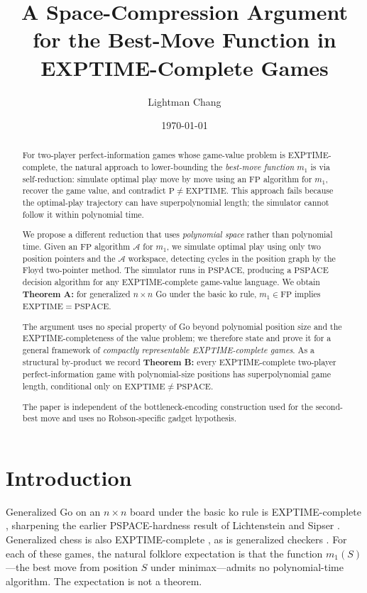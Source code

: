 \documentclass[11pt,a4paper]{amsart}
\title{A Space-Compression Argument for the Best-Move Function
  in EXPTIME-Complete Games}
\author{Lightman Chang}
\date{\today}
\theoremstyle{plain}
\theoremstyle{definition}
\theoremstyle{remark}
\newcommand{\FP}{\mathrm{FP}}
\newcommand{\PTIME}{\mathrm{P}}
\newcommand{\EXPTIME}{\mathrm{EXPTIME}}
\newcommand{\PSPACE}{\mathrm{PSPACE}}
\begin{document}
\maketitle

\begin{abstract}
For two-player perfect-information games whose game-value problem is
EXPTIME-complete, the natural approach to lower-bounding the
\emph{best-move function} $m_1$ is via self-reduction: simulate optimal
play move by move using an $\FP$ algorithm for $m_1$, recover the game
value, and contradict $\PTIME \neq \EXPTIME$. This approach fails
because the optimal-play trajectory can have superpolynomial length;
the simulator cannot follow it within polynomial time.

We propose a different reduction that uses \emph{polynomial space}
rather than polynomial time. Given an $\FP$ algorithm $\mathcal{A}$ for
$m_1$, we simulate optimal play using only two position pointers and
the $\mathcal{A}$ workspace, detecting cycles in the position graph by
the Floyd two-pointer method. The simulator runs in $\PSPACE$,
producing a $\PSPACE$ decision algorithm for any
EXPTIME-complete game-value language. We obtain
\textbf{Theorem A:} for generalized $n \times n$ Go under the basic ko
rule, $m_1 \in \FP$ implies $\EXPTIME = \PSPACE$.

The argument uses no special property of Go beyond polynomial position
size and the EXPTIME-completeness of the value problem; we therefore
state and prove it for a general framework of \emph{compactly
representable EXPTIME-complete games}. As a structural by-product we
record \textbf{Theorem B:} every EXPTIME-complete two-player
perfect-information game with polynomial-size positions has
superpolynomial game length, conditional only on
$\EXPTIME \neq \PSPACE$.

The paper is independent of the bottleneck-encoding construction used
for the second-best move and uses no Robson-specific gadget hypothesis.
\end{abstract}

\section{Introduction}
\label{sec:intro}

Generalized Go on an $n \times n$ board under the basic ko rule is
EXPTIME-complete \cite{Rob83}, sharpening the earlier PSPACE-hardness
result of Lichtenstein and Sipser \cite{LS80}. Generalized chess is
also EXPTIME-complete
\cite{FL81}, as is generalized checkers \cite{Rob84}. For each of these
games, the natural folklore expectation is that the function
$m_1(S)$---the best move from position $S$ under minimax---admits no
polynomial-time algorithm. The expectation is not a theorem.
\end{document}
